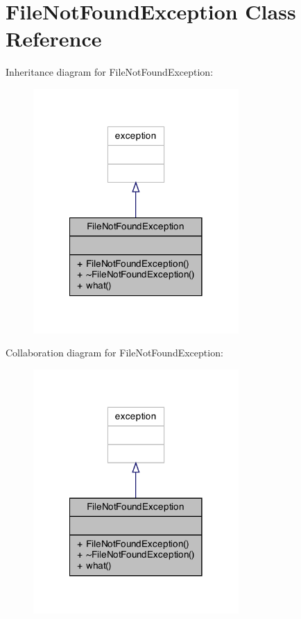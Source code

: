 \hypertarget{class_file_not_found_exception}{\section{File\+Not\+Found\+Exception Class Reference}
\label{class_file_not_found_exception}
}


Inheritance diagram for File\+Not\+Found\+Exception\+:\nopagebreak
\begin{figure}[H]
\begin{center}
\leavevmode
\includegraphics[width=222pt]{class_file_not_found_exception__inherit__graph}
\end{center}
\end{figure}


Collaboration diagram for File\+Not\+Found\+Exception\+:\nopagebreak
\begin{figure}[H]
\begin{center}
\leavevmode
\includegraphics[width=222pt]{class_file_not_found_exception__coll__graph}
\end{center}
\end{figure}
